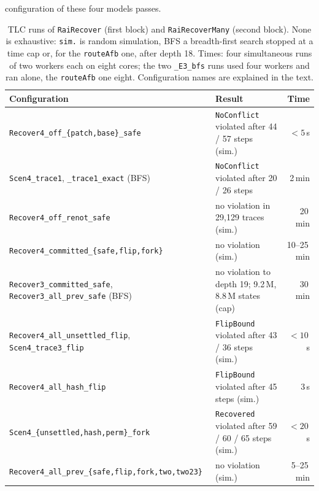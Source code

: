 \documentclass[conference]{IEEEtran}
\begin{document}
configuration of these four models passes.

\begin{table}[t]
\caption{TLC runs of \texttt{RaiRecover} (first block) and \texttt{RaiRecoverMany} (second block). None is exhaustive: \texttt{sim.} is random simulation, BFS a breadth-first search stopped at a time cap or, for the \texttt{routeAfb} one, after depth 18. Times: four simultaneous runs of two workers each on eight cores; the two \texttt{\_E3\_bfs} runs used four workers and ran alone, the \texttt{routeAfb} one eight. Configuration names are explained in the text.}
\label{tab:tlc-recover}
\centering
\small
\begin{tabularx}{\textwidth}{@{}>{\raggedright\arraybackslash}p{}Yr@{}}
\toprule
Configuration & Result & Time\\
\midrule
\texttt{Recover4\_\allowbreak{}off\_\allowbreak{}\{patch,\allowbreak{}base\}\_\allowbreak{}safe} & \texttt{NoConflict} violated after 44 / 57 steps (sim.) & $<5$\,s\\
\texttt{Scen4\_\allowbreak{}trace1},\allowbreak{} \texttt{\_\allowbreak{}trace1\_\allowbreak{}exact} (BFS) & \texttt{NoConflict} violated after 20 / 26 steps & 2\,min\\
\texttt{Recover4\_\allowbreak{}off\_\allowbreak{}renot\_\allowbreak{}safe} & no violation in 29{,}129 traces (sim.) & 20\,min\\
\texttt{Recover4\_\allowbreak{}committed\_\allowbreak{}\{safe,\allowbreak{}flip,\allowbreak{}fork\}} & no violation (sim.) & 10--25\,min\\
\texttt{Recover3\_\allowbreak{}committed\_\allowbreak{}safe},\allowbreak{} \texttt{Recover3\_\allowbreak{}all\_\allowbreak{}prev\_\allowbreak{}safe} (BFS) & no violation to depth 19; 9.2\,M, 8.8\,M states (cap) & 30\,min\\
\texttt{Recover4\_\allowbreak{}all\_\allowbreak{}unsettled\_\allowbreak{}flip},\allowbreak{} \texttt{Scen4\_\allowbreak{}trace3\_\allowbreak{}flip} & \texttt{FlipBound} violated after 43 / 36 steps (sim.) & $<10$\,s\\
\texttt{Recover4\_\allowbreak{}all\_\allowbreak{}hash\_\allowbreak{}flip} & \texttt{FlipBound} violated after 45 steps (sim.) & 3\,s\\
\texttt{Scen4\_\allowbreak{}\{unsettled,\allowbreak{}hash,\allowbreak{}perm\}\_\allowbreak{}fork} & \texttt{Recovered} violated after 59 / 60 / 65 steps (sim.) & $<20$\,s\\
\texttt{Recover4\_\allowbreak{}all\_\allowbreak{}prev\_\allowbreak{}\{safe,\allowbreak{}flip,\allowbreak{}fork,\allowbreak{}two,\allowbreak{}two23\}} & no violation (sim.) & 5--25\,min\\

\end{tabularx}
\end{table}
\end{document}
